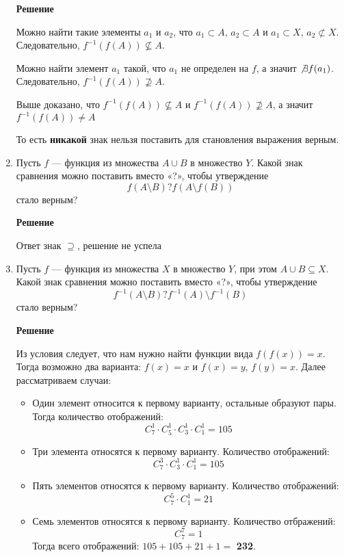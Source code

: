 \documentclass[12pt]{article}
\begin{document}
\begin{enumerate}[label={\textbf{\arabic{section}.\arabic*}}]
		\textbf{Решение}
		
		Можно найти такие элементы $a_1$ и $a_2$, что $a_1\subset A$, $a_2\subset A$ и $a_1\subset X$, $a_2\not\subset X$. Следовательно, $f^{-1}(f(A))\not\subseteq A$.
		
		Можно найти элемент $a_1$ такой, что $a_1$ не определен на $f$, а значит $\not\exists f(a_1)$. Следовательно, $f^{-1}(f(A))\not\supseteq A$.
		
		Выше доказано, что $f^{-1}(f(A))\not\subseteq A$ и $f^{-1}(f(A))\not\supseteq A$, а значит $f^{-1}(f(A))\neq A$
		
		То есть \textbf{никакой} знак нельзя поставить для становления выражения верным.
		
		\item Пусть $f$ --- функция из множества $A\cup B$ в множество $Y$. Какой знак сравнения можно поставить вместо «?», чтобы утверждение
		$$
		f(A\setminus B)?f(A\setminus f(B))
		$$
		стало верным?
		
		\textbf{Решение}
		
		Ответ знак $\supseteq$, решение не успела
		
		\item Пусть $f$ --- функция из множества $X$ в множество $Y$, при этом $A\cup B\subseteq X$. Какой знак сравнения можно поставить вместо «?», чтобы утверждение
		$$
		f^{-1}(A\setminus B)?f^{-1}(A)\setminus f^{-1}(B)
		$$
		стало верным?
		
		\textbf{Решение}
		
		Из условия следует, что нам нужно найти функции вида $f(f(x)) = x$. Тогда возможно два варианта: $f(x) = x$ и $f(x) = y$, $f(y) = x$. Далее рассматриваем случаи:
		\begin{itemize}
			\item Один элемент относится к первому варианту, остальные образуют пары. Тогда количество отображений:
			$$
			C_7^1\cdot C_5^1\cdot C_3^1\cdot C_1^1 = 105 
			$$
			\item Три элемента относятся к первому варианту. Количество отображений:
			$$
			C_7^3\cdot C_3^1\cdot C_1^1 = 105 
			$$
			\item Пять элементов относятся к первому варианту. Количество отображений:
			$$
			C_7^5\cdot C_1^1 = 21
			$$
			\item Семь элементов относятся к первому варианту. Количество отбражений:
			$$
			C_7^7 = 1
			$$
			Тогда всего отображений: $105 + 105 + 21 + 1 =$ \textbf{232}.
		\end{itemize}
	

\end{enumerate}
\end{document}
